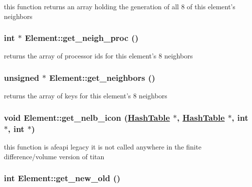 this function returns an array holding the generation of all 8 of this element's neighbors 

\hypertarget{classElement_a29}{
\subsubsection[get\_\-neigh\_\-proc]{\setlength{\rightskip}{0pt plus 5cm}int $\ast$ Element::get\_\-neigh\_\-proc ()}}
\label{classElement_a29}


returns the array of processor ids for this element's 8 neighbors 

\hypertarget{classElement_a28}{
\subsubsection[get\_\-neighbors]{\setlength{\rightskip}{0pt plus 5cm}unsigned $\ast$ Element::get\_\-neighbors ()}}
\label{classElement_a28}


returns the array of keys for this element's 8 neighbors 

\hypertarget{classElement_a52}{
\subsubsection[get\_\-nelb\_\-icon]{\setlength{\rightskip}{0pt plus 5cm}void Element::get\_\-nelb\_\-icon (\hyperlink{classHashTable}{Hash\-Table} $\ast$, \hyperlink{classHashTable}{Hash\-Table} $\ast$, int $\ast$, int $\ast$)}}
\label{classElement_a52}


this function is afeapi legacy it is not called anywhere in the finite difference/volume version of titan 

\hypertarget{classElement_a48}{
\subsubsection[get\_\-new\_\-old]{\setlength{\rightskip}{0pt plus 5cm}int Element::get\_\-new\_\-old ()}}
\label{classElement_a48}


